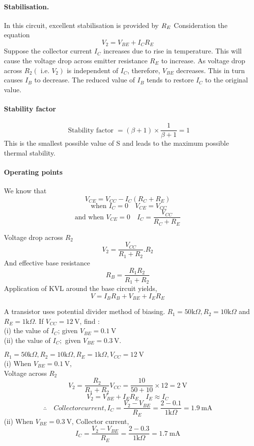    \paragraph{Stabilisation.}
    In this circuit, excellent stabilisation is provided by $R_{E}\\
    $ Consideration the equation
   $$
   V_{2}=V_{B E}+I_{C} R_{E}
   $$
   Suppose the collector current $I_{C}$ increases due to rise in temperature. This will cause the voltage drop across emitter resistance $R_{E}$ to increase. As voltage drop across $R_{2}\left(\right.$ i.e. $\left.V_{2}\right)$ is independent of $I_{C}$, therefore, $V_{B E}$ decreases. This in turn causes $I_{B}$ to decrease. The reduced value of $I_{B}$ tends to restore $I_{C}$ to the original value.
   \paragraph{Stability factor}
    $$\text{ Stability factor } =(\beta+1) \times \frac{1}{\beta+1}=1$$This is the smallest possible value of S and leads to the maximum possible thermal stability.\\
    \paragraph{Operating points}
    We know that$$V_{C E} =V_{C C}-I_{C}\left(R_{C}+R_{E}\right)$$
    $$\text{ when } I_C=0 \quad  V_{CE}=V_{CC}$$
    $$\text{and when } V_{CE}=0 \quad I_{C}=\frac{V_{CC}}{R_C+R_E}$$
    \begin{note}
    	Voltage drop across $R_2$\\
    	$$V_2=\frac{V_{CC}}{R_1+R_2}.R_2$$
    	And effective base resistance $$R_B=\frac{R_1R_2}{R_1+R_2}$$
    	Application of KVL around the base circuit yields,\\
    	$$V=I_BR_B+V_{BE}+I_ER_E$$	
    \end{note}
\begin{exercise}
	 A transistor uses potential divider method of biasing. $R_{1}=50 \mathrm{k} \Omega, R_{2}=10 \mathrm{k} \Omega$ and $R_{E}=1 \mathrm{k} \Omega$. If $V_{C C}=12 \mathrm{~V}$, find :\\
(i) the value of $I_{C}$; given $V_{B E}=0.1 \mathrm{~V}$\\
(ii) the value of $I_{C} ;$ given $V_{B E}=0.3 \mathrm{~V}$. 	
\end{exercise}
\begin{answer}
$R_{1}=50 \mathrm{k} \Omega, R_{2}=10 \mathrm{k} \Omega, R_{E}=1 \mathrm{k} \Omega, V_{C C}=12 \mathrm{~V}$\\
(i) When $V_{B E}=0.1 \mathrm{~V}$,\\
Voltage across $R_{2}$ $$V_{2}=\frac{R_{2}}{R_{1}+R_{2}} V_{C C}=\frac{10}{50+10} \times 12=2 \mathrm{~V}$$
$$V_2=V_{BE}+I_ER_E \quad I_E\approx I_C$$
$$\therefore \quad
 Collector current, I_{C}=\frac{V_{2}-V_{B E}}{R_{E}}=\frac{2-0.1}{1 \mathrm{k} \Omega}=1.9 \mathrm{~mA}$$
 (ii) When $V_{B E}=0.3 \mathrm{~V}$,
 Collector current, $$I_{C}=\frac{V_{2}-V_{B E}}{R_{E}}=\frac{2-0.3}{1 \mathrm{k} \Omega}=1.7 \mathrm{~mA}$$	
\end{answer}

